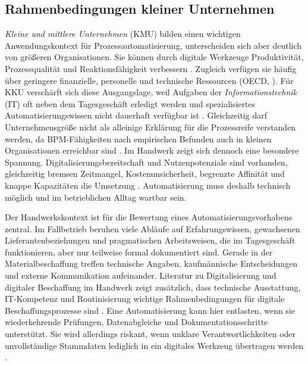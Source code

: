 \documentclass[a4paper,12pt]{article}
\begin{document}
\subsection{Rahmenbedingungen kleiner Unternehmen}
\textit{Kleine und mittlere Unternehmen} (KMU) bilden einen wichtigen Anwendungskontext für Prozessautomatisierung, unterscheiden sich aber deutlich von größeren Organisationen. Sie können durch digitale Werkzeuge Produktivität, Prozessqualität und Reaktionsfähigkeit verbessern \parencite{moreira_business_2024}. Zugleich verfügen sie häufig über geringere finanzielle, personelle und technische Ressourcen (OECD, \citeyear{oecd_digital_2021}). Für KKU verschärft sich diese Ausgangslage, weil Aufgaben der \textit{Informationstechnik} (IT) oft neben dem Tagesgeschäft erledigt werden und spezialisiertes Automatisierungswissen nicht dauerhaft verfügbar ist \parencite{moreira_methodology_2025}. Gleichzeitig darf Unternehmensgröße nicht als alleinige Erklärung für die Prozessreife verstanden werden, da BPM-Fähigkeiten nach empirischen Befunden auch in kleinen Organisationen erreichbar sind \parencite{van_looy_effect_2018}. Im Handwerk zeigt sich dennoch eine besondere Spannung. Digitalisierungsbereitschaft und Nutzenpotenziale sind vorhanden, gleichzeitig bremsen Zeitmangel, Kostenunsicherheit, begrenzte Affinität und knappe Kapazitäten die Umsetzung \parencite{beuchel_digitalisierung_2024}. Automatisierung muss deshalb technisch möglich und im betrieblichen Alltag wartbar sein.

Der Handwerkskontext ist für die Bewertung eines Automatisierungsvorhabens zentral. Im Fallbetrieb beruhen viele Abläufe auf Erfahrungswissen, gewachsenen Lieferantenbeziehungen und pragmatischen Arbeitsweisen, die im Tagesgeschäft funktionieren, aber nur teilweise formal dokumentiert sind. Gerade in der Materialbeschaffung treffen technische Angaben, kaufmännische Entscheidungen und externe Kommunikation aufeinander. Literatur zu Digitalisierung und digitaler Beschaffung im Handwerk zeigt zusätzlich, dass technische Ausstattung, IT-Kompetenz und Routinisierung wichtige Rahmenbedingungen für digitale Beschaffungsprozesse sind \parencite{beuchel_digitalisierung_2024,hepp_adoption_2021}. Eine Automatisierung kann hier entlasten, wenn sie wiederkehrende Prüfungen, Datenabgleiche und Dokumentationsschritte unterstützt. Sie wird allerdings riskant, wenn unklare Verantwortlichkeiten oder unvollständige Stammdaten lediglich in ein digitales Werkzeug übertragen werden \parencite{moreira_business_2024,moreira_methodology_2025}.
\end{document}
